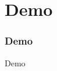 \documentclass[british,10pt]{beamer}
\begin{document}
%
%

\section{Demo}
%  
\begin{frame}\frametitle{Demo}
\centering
\Huge Demo
\end{frame}
\end{document}
